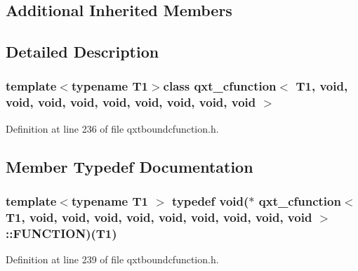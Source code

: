 \subsection*{Additional Inherited Members}


\subsection{Detailed Description}
\subsubsection*{template$<$typename T1$>$class qxt\-\_\-cfunction$<$ T1, void, void, void, void, void, void, void, void, void $>$}



Definition at line 236 of file qxtboundcfunction.\-h.



\subsection{Member Typedef Documentation}
\hypertarget{classqxt__cfunction_3_01_t1_00_01void_00_01void_00_01void_00_01void_00_01void_00_01void_00_01void_00_01void_00_01void_01_4_a308014a7c07281f5ca21cfae5f1fd02c}{
\subsubsection[{F\-U\-N\-C\-T\-I\-O\-N}]{\setlength{\rightskip}{0pt plus 5cm}template$<$typename T1 $>$ typedef {\bf void}($\ast$ {\bf qxt\-\_\-cfunction}$<$ T1, {\bf void}, {\bf void}, {\bf void}, {\bf void}, {\bf void}, {\bf void}, {\bf void}, {\bf void}, {\bf void} $>$\-::F\-U\-N\-C\-T\-I\-O\-N)(T1)}}\label{classqxt__cfunction_3_01_t1_00_01void_00_01void_00_01void_00_01void_00_01void_00_01void_00_01void_00_01void_00_01void_01_4_a308014a7c07281f5ca21cfae5f1fd02c}


Definition at line 239 of file qxtboundcfunction.\-h.



